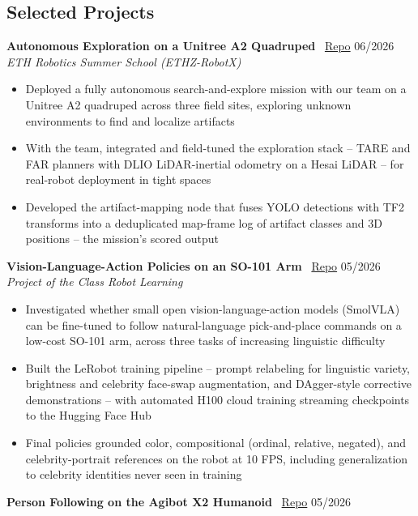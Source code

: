 \documentclass[a4paper,10pt]{article}
\begin{document}
\subsection*{Selected Projects}
\textbf{Autonomous Exploration on a Unitree A2 Quadruped} \faGithub\ \href{https://github.com/alessiosalvatore1703-ops/RSS_sim2win}{Repo} \hfill 06/2026\\
\textit{ETH Robotics Summer School (ETHZ-RobotX)}
\begin{itemize}
    \vspace{-5pt}
    \item Deployed a fully autonomous search-and-explore mission with our team on a Unitree A2 quadruped across three field sites, exploring unknown environments to find and localize artifacts
    \item With the team, integrated and field-tuned the exploration stack -- TARE and FAR planners with DLIO LiDAR-inertial odometry on a Hesai LiDAR -- for real-robot deployment in tight spaces
    \item Developed the artifact-mapping node that fuses YOLO detections with TF2 transforms into a deduplicated map-frame log of artifact classes and 3D positions -- the mission's scored output
\end{itemize}
\textbf{Vision-Language-Action Policies on an SO-101 Arm} \faGithub\ \href{https://github.com/alessiosalvatore1703-ops/VLA-robotlearning}{Repo} \hfill 05/2026\\
\textit{Project of the Class Robot Learning}
\begin{itemize}
    \vspace{-5pt}
    \item Investigated whether small open vision-language-action models (SmolVLA) can be fine-tuned to follow natural-language pick-and-place commands on a low-cost SO-101 arm, across three tasks of increasing linguistic difficulty
    \item Built the LeRobot training pipeline -- prompt relabeling for linguistic variety, brightness and celebrity face-swap augmentation, and DAgger-style corrective demonstrations -- with automated H100 cloud training streaming checkpoints to the Hugging Face Hub
    \item Final policies grounded color, compositional (ordinal, relative, negated), and celebrity-portrait references on the robot at 10 FPS, including generalization to celebrity identities never seen in training
\end{itemize}
\textbf{Person Following on the Agibot X2 Humanoid} \faGithub\ \href{https://github.com/alessiosalvatore1703-ops/robohack2026}{Repo} \hfill 05/2026\\
\end{document}
